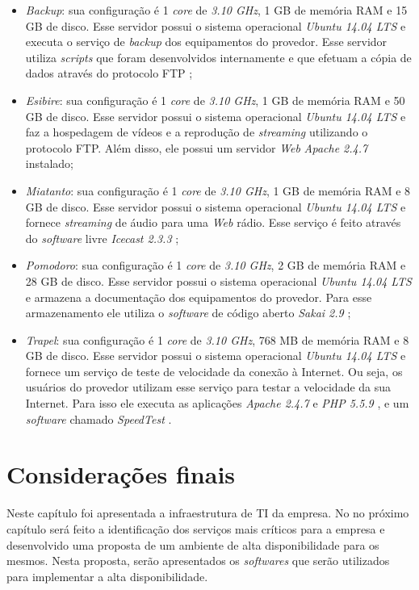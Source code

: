 \begin{itemize}
 \item \textit{Backup}: sua configuração é 1 \textit{core} de \textit{3.10 GHz}, 1 GB de memória \ac{RAM} e 15 GB de disco. 
 Esse servidor possui o sistema operacional \textit{Ubuntu 14.04 \ac{LTS}} \cite{ubuntu} e executa o serviço de \textit{backup} dos equipamentos 
 do provedor. Esse servidor utiliza \textit{scripts} que foram desenvolvidos internamente e que efetuam a cópia de dados através do protocolo 
 \ac{FTP} \cite{kurose2006};
 
 \item \textit{Esibire}: sua configuração é 1 \textit{core} de \textit{3.10 GHz}, 1 GB de memória \ac{RAM} e 50 GB de disco. 
 Esse servidor possui o sistema operacional \textit{Ubuntu 14.04 \ac{LTS}} \cite{ubuntu} e faz a hospedagem de vídeos e a reprodução de 
 \textit{streaming} utilizando o protocolo \ac{FTP}. Além disso, ele possui um servidor \textit{Web} \textit{Apache 2.4.7} instalado;
 
 \item \textit{Miatanto}: sua configuração é 1 \textit{core} de \textit{3.10 GHz}, 1 GB de memória \ac{RAM} e 8 GB de disco. 
 Esse servidor possui o sistema operacional \textit{Ubuntu 14.04 \ac{LTS}} \cite{ubuntu} e fornece \textit{streaming} de áudio para uma \textit{Web} 
 rádio. Esse serviço é feito através do \textit{software} livre \textit{Icecast 2.3.3} \cite{icecast};
 
 \item \textit{Pomodoro}: sua configuração é 1 \textit{core} de \textit{3.10 GHz}, 2 GB de memória \ac{RAM} e 28 GB de disco. 
 Esse servidor possui o sistema operacional \textit{Ubuntu 14.04 \ac{LTS}} \cite{ubuntu} e armazena a documentação dos equipamentos do provedor. 
 Para esse armazenamento ele utiliza o \textit{software} de código aberto \textit{Sakai 2.9} \cite{sakai};
 
 \item \textit{Trapel}: sua configuração é 1 \textit{core} de \textit{3.10 GHz}, 768 MB de memória \ac{RAM} e 8 GB de disco. 
 Esse servidor possui o sistema operacional \textit{Ubuntu 14.04 \ac{LTS}} \cite{ubuntu} e fornece um serviço de teste de velocidade da conexão 
 à Internet. Ou seja, os usuários do provedor utilizam esse serviço para testar a velocidade da sua Internet. Para isso ele executa as aplicações 
 \textit{Apache 2.4.7} \cite{apache} e \textit{\ac{PHP} 5.5.9} \cite{php}, e um \textit{software} chamado \textit{SpeedTest} \cite{speedtest}.
\end{itemize}

\section{Considerações finais}

Neste capítulo foi apresentada a infraestrutura de \ac{TI} da empresa. No no próximo capítulo será feito a identificação dos serviços mais 
críticos para a empresa e desenvolvido uma proposta de um ambiente de alta disponibilidade para os mesmos. Nesta proposta, serão apresentados os 
\textit{softwares} que serão utilizados para implementar a alta disponibilidade.

